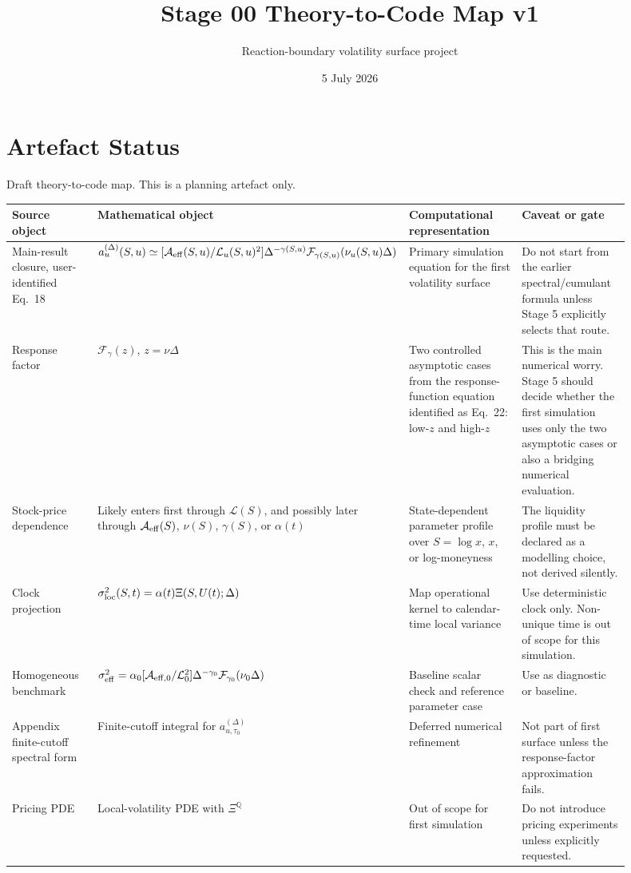 \documentclass[11pt]{article}
\title{Stage 00 Theory-to-Code Map v1}
\author{Reaction-boundary volatility surface project}
\date{5 July 2026}
\begin{document}
\maketitle

\section*{Artefact Status}
Draft theory-to-code map. This is a planning artefact only.

\begin{longtable}{p{0.18\linewidth}p{0.22\linewidth}p{0.28\linewidth}p{0.22\linewidth}}
\toprule
Source object & Mathematical object & Computational representation & Caveat or gate \\
\midrule
Main-result closure, user-identified Eq.~18 &
\(a_u^{(\Delta)}(S,u)\simeq [\mathcal A_{\rm eff}(S,u)/\mathcal L_u(S,u)^2]\Delta^{-\gamma(S,u)}
\mathcal F_{\gamma(S,u)}(\nu_u(S,u)\Delta)\) &
Primary simulation equation for the first volatility surface &
Do not start from the earlier spectral/cumulant formula unless Stage 5 explicitly selects that route. \\
\midrule
Response factor &
\(\mathcal F_\gamma(z)\), \(z=\nu\Delta\) &
Two controlled asymptotic cases from the response-function equation identified as Eq.~22: low-\(z\) and high-\(z\) &
This is the main numerical worry. Stage 5 should decide whether the first simulation uses only the two asymptotic cases or also a bridging numerical evaluation. \\
\midrule
Stock-price dependence &
Likely enters first through \(\mathcal L(S)\), and possibly later through \(\mathcal A_{\rm eff}(S)\), \(\nu(S)\), \(\gamma(S)\), or \(\alpha(t)\) &
State-dependent parameter profile over \(S=\log x\), \(x\), or log-moneyness &
The liquidity profile must be declared as a modelling choice, not derived silently. \\
\midrule
Clock projection &
\(\sigma_{\rm loc}^2(S,t)=\alpha(t)\Xi(S,U(t);\Delta)\) &
Map operational kernel to calendar-time local variance &
Use deterministic clock only. Non-unique time is out of scope for this simulation. \\
\midrule
Homogeneous benchmark &
\(\sigma_{\rm eff}^2=\alpha_0[\mathcal A_{\rm eff,0}/\mathcal L_0^2]\Delta^{-\gamma_0}\mathcal F_{\gamma_0}(\nu_0\Delta)\) &
Baseline scalar check and reference parameter case &
Use as diagnostic or baseline. \\
\midrule
Appendix finite-cutoff spectral form &
Finite-cutoff integral for \(a_{u,\tau_0}^{(\Delta)}\) &
Deferred numerical refinement &
Not part of first surface unless the response-factor approximation fails. \\
\midrule
Pricing PDE &
Local-volatility PDE with \(\Xi^\mathbb Q\) &
Out of scope for first simulation &
Do not introduce pricing experiments unless explicitly requested. \\
\bottomrule
\end{longtable}
\end{document}
